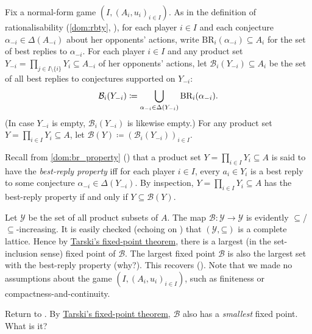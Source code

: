 \begin{example}[rationalisability]
	\label{example:rationalisability_tarski}
	Fix a normal-form game $(I,(A_i,u_i)_{i \in I})$. As in the definition of rationalisability (\cref{dom:rbty}, ), for each player $i \in I$ and each conjecture $\alpha_{-i} \in \Delta(A_{-i})$ about her opponents' actions, write $\text{BR}_i(\alpha_{-i}) \subseteq A_i$ for the set of best replies to $\alpha_{-i}$. For each player $i \in I$ and any product set $Y_{-i} = \prod_{j \in I \setminus \{i\}} Y_i \subseteq A_{-i}$ of her opponents' actions, let $\mathcal{B}_i(Y_{-i}) \subseteq A_i$ be the set of all best replies to conjectures supported on $Y_{-i}$:
	\begin{equation*}
		\mathcal{B}_i(Y_{-i}) \coloneqq
		\bigcup_{\alpha_{-i} \in \Delta(Y_{-i})}
		\text{BR}_i(\alpha_{-i}) .
	\end{equation*}
	(In case $Y_{-i}$ is empty, $\mathcal{B}_i(Y_{-i})$ is likewise empty.)
	For any product set $Y = \prod_{i \in I} Y_i \subseteq A$, let $\mathcal{B}(Y) \coloneqq \left( \mathcal{B}_i(Y_{-i}) \right)_{i \in I}$.

	Recall from \cref{dom:br_property} () that a product set $Y = \prod_{i \in I} Y_i \subseteq A$ is said to have the \emph{best-reply property} iff for each player $i \in I$, every $a_i \in Y_i$ is a best reply to some conjecture $\alpha_{-i} \in \Delta(Y_{-i})$. By inspection, $Y = \prod_{i \in I} Y_i \subseteq A$ has the best-reply property if and only if $Y \subseteq \mathcal{B}(Y)$.

	Let $\mathcal{Y}$ be the set of all product subsets of $A$. The map $\mathcal{B} : \mathcal{Y} \to \mathcal{Y}$ is evidently $\subseteq$/$\subseteq$-increasing. It is easily checked (echoing  on ) that $(\mathcal{Y},\mathord{\subseteq})$ is a complete lattice. Hence by \hyperref[theorem:tarski]{Tarski's fixed-point theorem}, there is a largest (in the set-inclusion sense) fixed point of $\mathcal{B}$. The largest fixed point $\mathcal{B}$ is also the largest set with the best-reply property (why?). This recovers  (). Note that we made no assumptions about the game $(I,(A_i,u_i)_{i \in I})$, such as finiteness or compactness-and-continuity.
\end{example}

\begin{exercise}
	\label{exercise:rationalisability_tarski}
	Return to . By \hyperref[theorem:tarski]{Tarski's fixed-point theorem}, $\mathcal{B}$ also has a \emph{smallest} fixed point. What is it?
\end{exercise}

